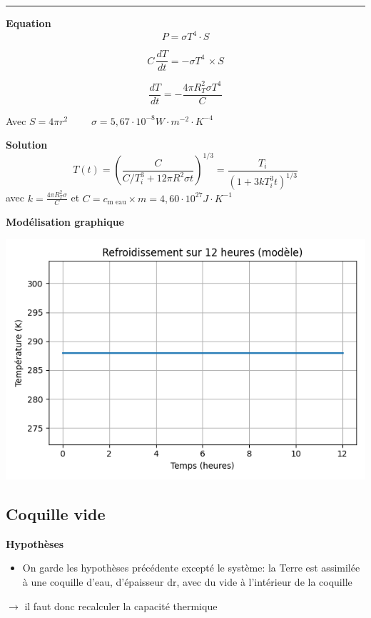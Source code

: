\documentclass[a4paper,12pt]{article}
\begin{document}
\noindent\textcolor{gray}{\rule{\linewidth}{0.4pt}} 

\vspace{1em}

\textbf{Equation}
\[   P = \sigma T^4 \cdot S
\]

\[    C \, \frac{dT}{dt} = - \sigma T^4 \,  \times S
\]

\[\frac{dT}{dt} = - \frac{4 \pi R_T^2 \sigma T^4}{C}\]  

Avec 
\(S= 4\pi r^2\)
\ \ \ \
\(\sigma=5,67 \cdot 10^{-8} W\cdot m^{-2} \cdot K^{-4}\)

\textbf{Solution} 
\[
T(t) = \left( \frac{C}{C/T_i^3 + 12\pi R^2 \sigma t} \right)^{1/3} 
= \frac{T_i}{\left(1 + 3k T_i^3 t \right)^{1/3}}
\]
avec \(k=\frac{4\pi R_T^2 \sigma}{C}\)
et \(C=c_{\text{m eau}}\times m=4,60 \cdot 10^{27} J\cdot K^{-1}\)

\bigskip



\bigskip

\textbf{Modélisation graphique} 

\begin{center}
  \includegraphics[width=0.8\linewidth]{../modele1/figures/modele1.png}
\end{center}
    
    

\subsection{Coquille vide }
\textbf{Hypothèses}
\begin{itemize}
    \item On garde les hypothèses précédente excepté le système: la Terre est assimilée à une coquille d'eau, d'épaisseur dr, avec du vide à l'intérieur de la coquille 
    
\end{itemize}
$\rightarrow$ il faut donc recalculer la capacité thermique 
\end{document}
